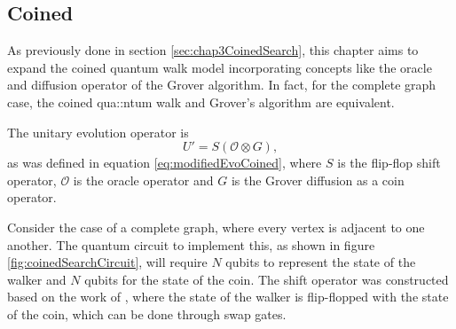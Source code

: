 \documentclass[../../dissertation.tex]{subfiles}
\begin{document}
\subsection{Coined}
As previously done in section \ref{sec:chap3CoinedSearch}, this chapter aims to expand the coined quantum walk model incorporating concepts like the oracle and diffusion operator of the Grover algorithm. In fact, for the complete graph case, the coined qua::ntum walk and Grover's algorithm are equivalent.\par
The unitary evolution operator is
\begin{equation}
        U' = S (\mathcal{O} \otimes G),\label{eq:modifiedEvoCoinedQiskit}
\end{equation}
as was defined in equation \ref{eq:modifiedEvoCoined}, where $S$ is the flip-flop shift operator, $\mathcal{O}$ is the oracle operator and $G$ is the Grover diffusion as a coin operator.\par
Consider the case of a complete graph, where every vertex is adjacent to one another. The quantum circuit to implement this, as shown in figure \ref{fig:coinedSearchCircuit}, will require $N$ qubits to represent the state of the walker and $N$ qubits for the state of the coin.  The shift operator was constructed based on the work of \cite{douglaswang07}, where the state of the walker is flip-flopped with the state of the coin, which can be done through swap gates.
\end{document}
